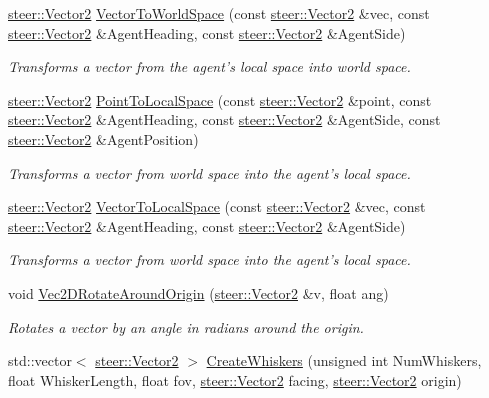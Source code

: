 \begin{DoxyCompactItemize}
\hyperlink{structsteer_1_1_vector2}{steer\-::\-Vector2} \hyperlink{namespacesteer_aa12c0f03d4fdf7cd6d9a1cb0eb4e44d6}{Vector\-To\-World\-Space} (const \hyperlink{structsteer_1_1_vector2}{steer\-::\-Vector2} \&vec, const \hyperlink{structsteer_1_1_vector2}{steer\-::\-Vector2} \&Agent\-Heading, const \hyperlink{structsteer_1_1_vector2}{steer\-::\-Vector2} \&Agent\-Side)
\begin{DoxyCompactList}\small\item\em Transforms a vector from the agent's local space into world space. \end{DoxyCompactList}\item 
\hyperlink{structsteer_1_1_vector2}{steer\-::\-Vector2} \hyperlink{namespacesteer_a2250b386a895ce7b5d655598f2510469}{Point\-To\-Local\-Space} (const \hyperlink{structsteer_1_1_vector2}{steer\-::\-Vector2} \&point, const \hyperlink{structsteer_1_1_vector2}{steer\-::\-Vector2} \&Agent\-Heading, const \hyperlink{structsteer_1_1_vector2}{steer\-::\-Vector2} \&Agent\-Side, const \hyperlink{structsteer_1_1_vector2}{steer\-::\-Vector2} \&Agent\-Position)
\begin{DoxyCompactList}\small\item\em Transforms a vector from world space into the agent's local space. \end{DoxyCompactList}\item 
\hyperlink{structsteer_1_1_vector2}{steer\-::\-Vector2} \hyperlink{namespacesteer_aa126e571dabf8b757cb02fd4d891b805}{Vector\-To\-Local\-Space} (const \hyperlink{structsteer_1_1_vector2}{steer\-::\-Vector2} \&vec, const \hyperlink{structsteer_1_1_vector2}{steer\-::\-Vector2} \&Agent\-Heading, const \hyperlink{structsteer_1_1_vector2}{steer\-::\-Vector2} \&Agent\-Side)
\begin{DoxyCompactList}\small\item\em Transforms a vector from world space into the agent's local space. \end{DoxyCompactList}\item 
void \hyperlink{namespacesteer_acf07b9c3ceca3a265cf2e6b45580ff6d}{Vec2\-D\-Rotate\-Around\-Origin} (\hyperlink{structsteer_1_1_vector2}{steer\-::\-Vector2} \&v, float ang)
\begin{DoxyCompactList}\small\item\em Rotates a vector by an angle in radians around the origin. \end{DoxyCompactList}\item 
std\-::vector$<$ \hyperlink{structsteer_1_1_vector2}{steer\-::\-Vector2} $>$ \hyperlink{namespacesteer_adfd4285a89a4b46d9bfc1e307f490dbb}{Create\-Whiskers} (unsigned int Num\-Whiskers, float Whisker\-Length, float fov, \hyperlink{structsteer_1_1_vector2}{steer\-::\-Vector2} facing, \hyperlink{structsteer_1_1_vector2}{steer\-::\-Vector2} origin)

\end{DoxyCompactItemize}
